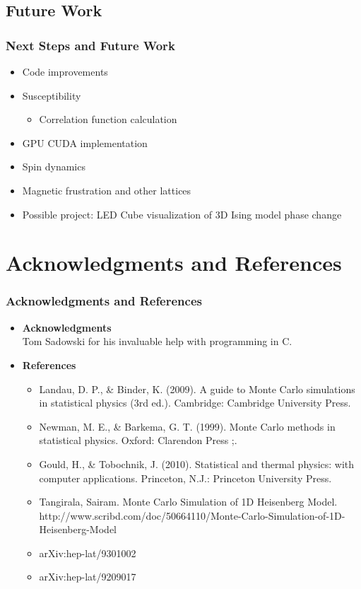 \documentclass{beamer}
\begin{document}
  \subsection*{Future Work}
  \begin{frame}
    \frametitle{Next Steps and Future Work}
    \begin{itemize}
      \item Code improvements
    	\item Susceptibility
    	\begin{itemize}
    		\item Correlation function calculation    	
    	\end{itemize}
    	\item GPU CUDA implementation
    	\item Spin dynamics
    	\item Magnetic frustration and other lattices
    	\item Possible project: LED Cube visualization of 3D Ising model phase change
    \end{itemize}
  \end{frame}
  
  \section{Acknowledgments and References}
  \begin{frame}
  	\frametitle{Acknowledgments and References}
  	\begin{itemize}
  		\item \textbf{Acknowledgments} \\
  					Tom Sadowski for his invaluable help with programming in C.
  		\item \textbf{References}
  		\begin{itemize}
  			\item Landau, D. P., & Binder, K. (2009). A guide to Monte Carlo simulations in statistical physics (3rd ed.). Cambridge: Cambridge University Press.
  			\item Newman, M. E., & Barkema, G. T. (1999). Monte Carlo methods in statistical physics. Oxford: Clarendon Press ;.
  			\item Gould, H., & Tobochnik, J. (2010). Statistical and thermal physics: with computer applications. Princeton, N.J.: Princeton University Press.
  			\item Tangirala, Sairam. Monte Carlo Simulation of 1D Heisenberg Model. http://www.scribd.com/doc/50664110/Monte-Carlo-Simulation-of-1D-Heisenberg-Model
  			\item arXiv:hep-lat/9301002
  			\item arXiv:hep-lat/9209017
  		\end{itemize}
  	\end{itemize}
  \end{frame}
  
  
\end{document}
